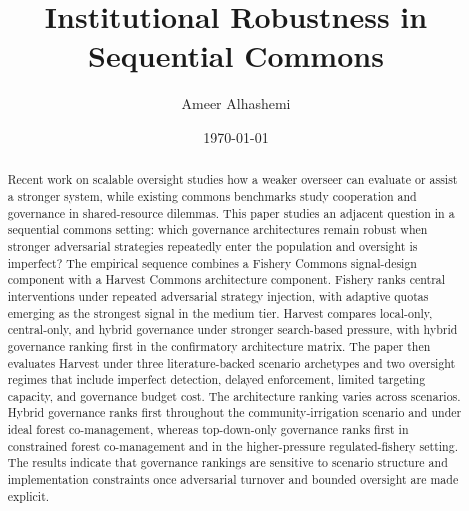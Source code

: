 \documentclass[11pt]{article}
\title{Institutional Robustness in Sequential Commons}
\author{Ameer Alhashemi}
\date{\today}
\begin{document}
\maketitle

\begin{abstract}
Recent work on scalable oversight studies how a weaker overseer can evaluate or assist a stronger system, while existing commons benchmarks study cooperation and governance in shared-resource dilemmas. This paper studies an adjacent question in a sequential commons setting: which governance architectures remain robust when stronger adversarial strategies repeatedly enter the population and oversight is imperfect? The empirical sequence combines a Fishery Commons signal-design component with a Harvest Commons architecture component. Fishery ranks central interventions under repeated adversarial strategy injection, with adaptive quotas emerging as the strongest signal in the medium tier. Harvest compares local-only, central-only, and hybrid governance under stronger search-based pressure, with hybrid governance ranking first in the confirmatory architecture matrix. The paper then evaluates Harvest under three literature-backed scenario archetypes and two oversight regimes that include imperfect detection, delayed enforcement, limited targeting capacity, and governance budget cost. The architecture ranking varies across scenarios. Hybrid governance ranks first throughout the community-irrigation scenario and under ideal forest co-management, whereas top-down-only governance ranks first in constrained forest co-management and in the higher-pressure regulated-fishery setting. The results indicate that governance rankings are sensitive to scenario structure and implementation constraints once adversarial turnover and bounded oversight are made explicit.
\end{abstract}






\clearpage


\end{document}
